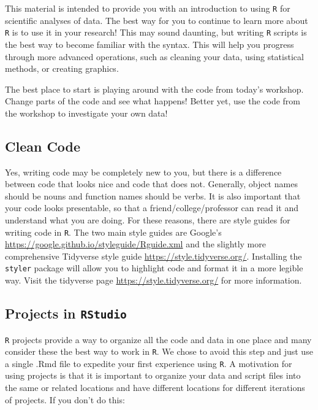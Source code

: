 \documentclass[
  10pt,
  letterpaper,
  twoside,
  openright]{book}
\begin{document}
This material is intended to provide you with an introduction to using
\texttt{R} for scientific analyses of data. The best way for you to
continue to learn more about \texttt{R} is to use it in your research!
This may sound daunting, but writing \texttt{R} scripts is the best way
to become familiar with the syntax. This will help you progress through
more advanced operations, such as cleaning your data, using statistical
methods, or creating graphics.

The best place to start is playing around with the code from today's
workshop. Change parts of the code and see what happens! Better yet, use
the code from the workshop to investigate your own data!

\hypertarget{clean-code}{%
\subsection{Clean Code}\label{clean-code}}

Yes, writing code may be completely new to you, but there is a
difference between code that looks nice and code that does not.
Generally, object names should be nouns and function names should be
verbs. It is also important that your code looks presentable, so that a
friend/college/professor can read it and understand what you are doing.
For these reasons, there are style guides for writing code in
\texttt{R}. The two main style guides are Google's
\url{https://google.github.io/styleguide/Rguide.xml} and the slightly
more comprehensive Tidyverse style guide
\url{https://style.tidyverse.org/}. Installing the \texttt{styler}
package will allow you to highlight code and format it in a more legible
way. Visit the tidyverse page \url{https://style.tidyverse.org/} for
more information.

\hypertarget{projects-in-rstudio-1}{%
\subsection{\texorpdfstring{Projects in
\texttt{RStudio}}{Projects in RStudio}}\label{projects-in-rstudio-1}}

\texttt{R} projects provide a way to organize all the code and data in
one place and many consider these the best way to work in \texttt{R}. We
chose to avoid this step and just use a single .Rmd file to expedite
your first experience using \texttt{R}. A motivation for using projects
is that it is important to organize your data and script files into the
same or related locations and have different locations for different
iterations of projects. If you don't do this:
\end{document}
